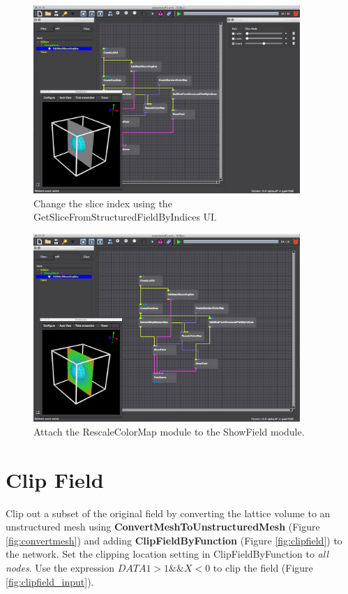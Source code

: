\documentclass[fleqn,11pt,openany]{book}
\begin{document}
\begin{figure}[H]
\center
\includegraphics[width=0.9\textwidth]{BasicTutorial_figures/changeslice.png}
\caption{Change the slice index using the GetSliceFromStructuredFieldByIndices UI.}
\label{fig:showslice}
\end{figure}

\begin{figure}[H]
\center
\includegraphics[width=0.9\textwidth]{BasicTutorial_figures/colorslice.png}
\caption{Attach the RescaleColorMap module to the ShowField module.}
\label{fig:showslice}
\end{figure}

\section{Clip Field}\label{clipfieldfunc}

Clip out a subset of the original field by converting the lattice volume to an unstructured mesh using \textbf{ConvertMeshToUnstructuredMesh} (Figure \ref{fig:convertmesh}) and adding \textbf{ClipFieldByFunction} (Figure \ref{fig:clipfield}) to the network.
Set the clipping location setting in ClipFieldByFunction to \emph{all nodes}.
Use the expression $DATA1> 1 \&\& X < 0$ to clip the field (Figure \ref{fig:clipfield_input}).
\end{document}
